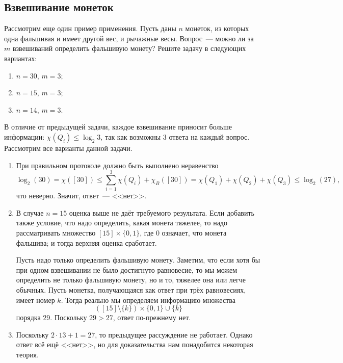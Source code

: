 \subsection{Взвешивание монеток}
\label{sec:fake-coin}

Рассмотрим еще один пример применения. Пусть даны $n$ монеток, из которых одна фальшивая и имеет другой
вес, и рычажные весы. Вопрос~--- можно ли за $m$ взвешиваний определить фальшивую монету? Решите задачу
в следующих вариантах:
\begin{enumerate}
    \item $n = 30$, $m = 3$;
  	\item $n = 15$, $m = 3$;
    \item $n = 14$, $m = 3$.
\end{enumerate}

В отличие от предыдущей задачи, каждое взвешивание приносит больше информации:
$\chi(Q_i) \leq \log_2 3$, так как возможны $3$ ответа на каждый вопрос. Рассмотрим все варианты данной задачи.
\begin{enumerate}
    \item При правильном протоколе должно быть выполнено неравенство
        $$
            \log_2(30) = \chi([30]) \le \sum_{i = 1}^3 \chi(Q_i) + \chi_B([30])
            = \chi(Q_1) + \chi(Q_2) + \chi(Q_3) \le \log_2(27),
        $$
		что неверно. Значит, ответ~--- <<нет>>.
    \item В случае $n = 15 $ оценка выше не даёт требуемого результата. Если добавить также условие, что
        надо определить, какая монета тяжелее, то надо рассматривать множество $[15] \times \{0, 1\}$, где
        $0$ означает, что монета фальшива; и тогда верхняя оценка сработает. 
		
		Пусть надо только определить фальшивую монету. Заметим, что если хотя бы при одном взвешивании не
        было достигнуто равновесие, то мы можем определить не только фальшивую монету, но и то, тяжелее
        она или легче обычных. Пусть монетка, получающаяся как ответ при трёх равновесиях, имеет номер
        $k$. Тогда реально мы определяем информацию множества
		$$([15] \setminus \{k\}) \times \{0,1\} \cup \{k\}$$
        порядка $29$. Поскольку $29 > 27$, ответ по-прежнему нет.
    \item Поскольку $2 \cdot 13 + 1 = 27$, то предыдущее рассуждение не работает. Однако ответ всё ещё
        <<нет>>, но для доказательства нам понадобится некоторая теория.
\end{enumerate}